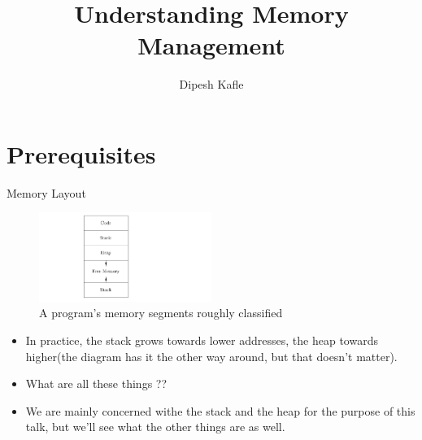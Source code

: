 \documentclass[
  10pt,
  ignorenonframetext,
]{beamer}
\title{Understanding Memory Management}
\author{Dipesh Kafle}
\date{}
\providecommand{\tightlist}{%
  \setlength{\itemsep}{0pt}\setlength{\parskip}{0pt}}
\begin{document}
\frame{\titlepage}

\hypertarget{prerequisites}{%
\section{Prerequisites}\label{prerequisites}}

\begin{frame}{Memory Layout}
\protect\hypertarget{memory-layout}{}
\begin{figure}
\centering
\includegraphics[width=0.5\textwidth,height=\textheight]{memory.png}
\caption{A program's memory segments roughly
classified}
\end{figure}

\begin{itemize}
\tightlist
\item
  In practice, the stack grows towards lower
  addresses, the heap towards higher(the diagram
  has it the other way around, but that doesn't
  matter).
\end{itemize}

\pause

\begin{itemize}
\tightlist
\item
  What are all these things ??
\end{itemize}

\pause

\begin{itemize}
\tightlist
\item
  We are mainly concerned withe the stack and the
  heap for the purpose of this talk, but we'll see
  what the other things are as well.
\end{itemize}
\end{frame}
\end{document}
